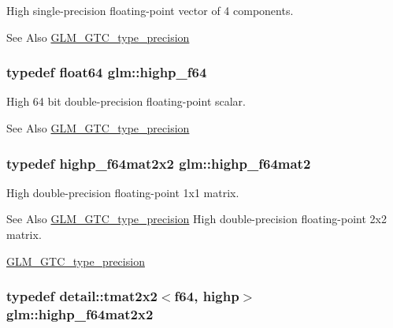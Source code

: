 High single-\/precision floating-\/point vector of 4 components. \begin{DoxySeeAlso}{See Also}
\hyperlink{group__gtc__type__precision}{G\-L\-M\-\_\-\-G\-T\-C\-\_\-type\-\_\-precision} 
\end{DoxySeeAlso}
\hypertarget{group__gtc__type__precision_gab1306a5a8ae99fb2867b548b1546bbe0}{
\subsubsection[{highp\-\_\-f64}]{\setlength{\rightskip}{0pt plus 5cm}typedef float64 {\bf glm\-::highp\-\_\-f64}}}\label{group__gtc__type__precision_gab1306a5a8ae99fb2867b548b1546bbe0}
High 64 bit double-\/precision floating-\/point scalar. \begin{DoxySeeAlso}{See Also}
\hyperlink{group__gtc__type__precision}{G\-L\-M\-\_\-\-G\-T\-C\-\_\-type\-\_\-precision} 
\end{DoxySeeAlso}
\hypertarget{group__gtc__type__precision_ga7d9fd446fd43310ba6f63c8f9468acc0}{
\subsubsection[{highp\-\_\-f64mat2}]{\setlength{\rightskip}{0pt plus 5cm}typedef highp\-\_\-f64mat2x2 {\bf glm\-::highp\-\_\-f64mat2}}}\label{group__gtc__type__precision_ga7d9fd446fd43310ba6f63c8f9468acc0}
High double-\/precision floating-\/point 1x1 matrix. \begin{DoxySeeAlso}{See Also}
\hyperlink{group__gtc__type__precision}{G\-L\-M\-\_\-\-G\-T\-C\-\_\-type\-\_\-precision} High double-\/precision floating-\/point 2x2 matrix. 

\hyperlink{group__gtc__type__precision}{G\-L\-M\-\_\-\-G\-T\-C\-\_\-type\-\_\-precision} 
\end{DoxySeeAlso}
\hypertarget{group__gtc__type__precision_ga4babca568fc88f185620c02e4fdac0d8}{
\subsubsection[{highp\-\_\-f64mat2x2}]{\setlength{\rightskip}{0pt plus 5cm}typedef detail\-::tmat2x2$<$f64, highp$>$ {\bf glm\-::highp\-\_\-f64mat2x2}}}\label{group__gtc__type__precision_ga4babca568fc88f185620c02e4fdac0d8}
